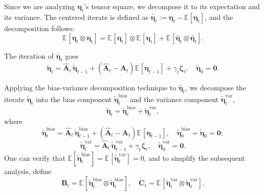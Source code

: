 \documentclass{article}
\theoremstyle{definition}
\theoremstyle{definition}
\theoremstyle{plain}
\theoremstyle{plain}
\theoremstyle{plain}
\newtheorem{lemma}{Lemma}
\theoremstyle{plain}
\theoremstyle{plain}
\newcommand{\bs}[1]{\boldsymbol{\mathbf{#1}}}
\newcommand{\Ex}{\mathbb{E}}
\newcommand{\id}{\mathbf{I}}
\newcommand{\bias}{\mathrm{bias}}
\newcommand{\var}{\mathrm{var}}
\newcommand{\ex}[2][]{\mathbb{E}_{#1}\left[ #2 \right]}
\newcommand{\para}[1]{\left(#1\right)}
\begin{document}
    

Since we are analyzing $\bs \eta_t$'s tensor square, we decompose it to its expectation and its variance. The centered iterate is defined as $\tilde{\bs\eta_t}:=\bs\eta_t-\Ex[\bs\eta_t]$, and the decomposition follows:
\begin{equation}
    \ex{\bs\eta_t\otimes \bs\eta_t} = \ex{\bs\eta_t}\otimes\ex{\bs\eta_t}+\ex{\tilde{\bs\eta_t}\otimes \tilde{\bs\eta_t}}.
\end{equation}

The iteration of $\tilde{\bs\eta_t}$ goes
\begin{equation}
    \tilde{\bs\eta}_t = \bs{\widehat A}_t\,\tilde{\bs\eta}_{t-1}+\para{\hat{\bs A}_t-\bs A_t}\ex{\bs \eta_{t-1}}+\gamma_t\bs\zeta_t,\quad\tilde{\bs\eta}_0 = \bs 0.
\end{equation}

Applying the bias-variance decomposition technique \cite{Jain2017}\cite{wu2022last} to $\tilde{\bs\eta_t}$, we decompose the iterate $\tilde{\bs\eta}_t$ into the bias component $\tilde{\bs\eta}_t^{\bias}$ and the variance component $\tilde{\bs\eta}_t^{\var}$,
\begin{equation}\label{fml:etabvdecomp}
    \tilde{\bs\eta}_t = \tilde{\bs\eta}_t^{\bias}+\tilde{\bs\eta}_t^{\var},
\end{equation}
where
\begin{equation}
    \tilde{\bs\eta}_t^{\bias} = \bs{\widehat A}_t\,\tilde{\bs\eta}_{t-1}^{\bias}+\para{\widehat{\bs A}_t-\bs A_t}\ex{\bs \eta_{t-1}},\quad \tilde{\bs\eta}_0^{\bias} = \tilde{\bs\eta}_0 = \bs 0;
\end{equation}
\begin{equation}
    \tilde{\bs\eta}_t^{\var}  =  \bs{\widehat A}_t\,\tilde{\bs\eta}_{t-1}^{\var}+ \gamma_t\bs\zeta_t,\quad \tilde{\bs\eta}_0^{\var} =\bs 0.
\end{equation}
One can verify that $\Ex[{\tilde{\bs\eta}_t^{\bias}}]=\ex{\tilde{\bs\eta}_t^{\var}}=0$, and to simplify the subsequent analysis, define
\begin{equation}
    \bs B_t = \ex{\tilde{\bs\eta}_t^{\bias}\otimes\tilde{\bs\eta}_t^{\bias}},\quad \bs C_t = \ex{\tilde{\bs\eta}_t^{\var}\otimes\tilde{\bs\eta}_t^{\var}}.
\end{equation}
\end{document}

